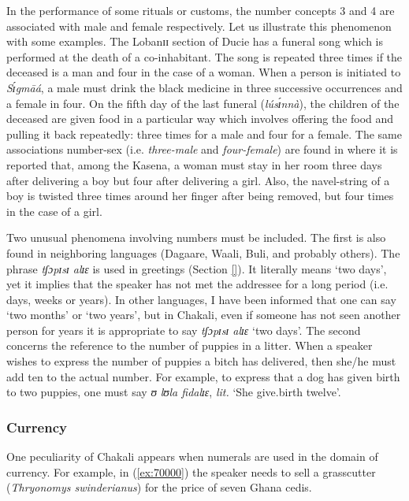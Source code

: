 \begin{exe}
\begin{exe}
\begin{exe}
{\begin{exe}
\begin{exe}
\begin{exe}
\begin{exe}
\begin{exe}
\begin{exe}
\begin{exe}
\begin{xlist}
\begin{exe}
\begin{exe}
\begin{exe}
In the performance of some rituals or customs, the number concepts 3
and 4 are associated with male and female respectively. Let us illustrate this
phenomenon 
with some examples. The Lobanɪɪ section of Ducie has a funeral song which is 
performed at
the death of a co-inhabitant. The song is repeated three times if the deceased
is a man and four in the case of a woman. When a person is initiated
to {\it Sɪ́gmāá}, a male must drink the black medicine in three successive
occurrences and a female in four.  On the fifth day of the last funeral 
({\it lúsɪ́nnà}), the children of the deceased are given food in a particular 
way
which involves offering the food and pulling  it back repeatedly: three times
for a male and four for a female. The same associations number-sex (i.e. {\it
three-male} and {\it
four-female})
are found in \citet[68-70]{Card27} where it is reported that, among the Kasena,
a woman must stay in her room three days after delivering a boy but four after
delivering a girl. Also,  the navel-string of a boy is twisted three times
 around her finger after being removed, but four times in the case of a
girl.

Two unusual phenomena involving numbers must be included. The first is
also found in neighboring languages (Dagaare, Waali, Buli, and probably 
others). 
The phrase {\it tʃɔpɪsɪ alɪɛ} is used in greetings (Section \ref{}).   It 
literally means `two
days', yet it implies that the speaker has not met the addressee for a long
period  (i.e. days, weeks or years). In other languages, I have been informed 
that one
can say `two months' or `two years', but in Chakali, even if someone has not
seen another person for years it is appropriate to say  {\it tʃɔpɪsɪ alɪɛ} `two
days'. The second concerns the reference to the number of puppies in a litter.
When a
speaker wishes to express the number of puppies a bitch has delivered, then
she/he
must add ten to the actual number. For example,  to express that a dog has given
birth to two puppies, one must say {\it ʊ lʊla fidalɪɛ},  {\it lit.}  `She
give.birth twelve'. 




\subsubsection{Currency}
\label{sec:NUM-currency}

One peculiarity of Chakali appears when numerals are used in the domain of
currency. For example,  in (\ref{ex:70000}) the speaker needs to sell a
grasscutter (\textit{Thryonomys swinderianus}) for the price of seven Ghana
cedis.



\end{exe}
\end{exe}
\end{exe}
\end{xlist}
\end{exe}
\end{exe}
\end{exe}
\end{exe}
\end{exe}
\end{exe}
\end{exe}}
\end{exe}
\end{exe}
\end{exe}

